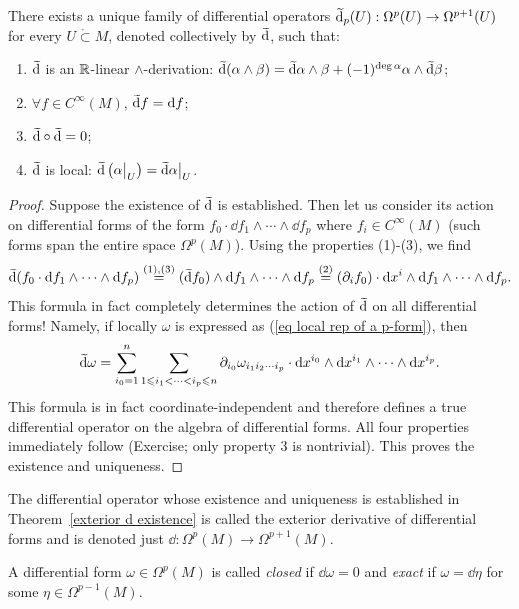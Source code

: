 \begin{thm}\label{exterior d existence}
    There exists a unique family of differential operators $\wt{\dd}_p(U):\Omega^p(U)\to \Omega^{p+1}(U)$ for every $U\mathring\subset M$, denoted collectively by $\wt\dd$, such that:
\begin{enumerate}
    \item $\wt\dd$ is an $\mathbb{R} $-linear $\wedge$-derivation: $\wt\dd(\alpha\wedge\beta)=\wt\dd\alpha\wedge\beta+(-1)^{\deg\alpha}\alpha\wedge\wt\dd\beta$;
    \item $\forall f\in C^\infty(M)$, $\wt\dd f=\dd f$;
    \item $\wt\dd\circ\wt\dd=0$;
    \item $\wt\dd$ is local: $\wt\dd\left(\restr{\alpha}{U}\right)=\restr{\wt\dd\alpha}{U}$.
\end{enumerate}
\end{thm}
\begin{proof}
Suppose the existence of $\wt\dd$ is established. Then let us consider its action on differential forms of the form $f_0\cdot \dd f_1\wedge \cdots \wedge \dd f_p$ where $f_i\in C^\infty(M)$ (such forms span the entire space $\Omega^p(M)$). Using the properties (1)-(3), we find
\[\wt\dd (f_0\cdot \dd f_1\wedge \cdots \wedge \dd f_p)\overset{(1),(3)}{=}(\wt\dd f_0) \wedge \dd f_1\wedge \cdots \wedge \dd f_p\overset{(2)}{=}(\partial_i f_0)\cdot \dd x^i\wedge \dd f_1\wedge \cdots \wedge \dd f_p.\]
This formula in fact completely determines the action of $\wt\dd$ on all differential forms! Namely, if locally $\omega$ is expressed as (\ref{eq local rep of a p-form}), then
\[\wt\dd \omega =\sum_{i_0=1}^n\sum_{1\leq i_1<\cdots <i_p\leq n}\partial_{i_0}\omega_{i_1 i_2\cdots i_p}\cdot \dd x^{i_0}\wedge \dd x^{i_1}\wedge\cdots\wedge \dd x^{i_p}.\label{eq local formula for d}\]
This formula is in fact coordinate-independent and therefore defines a true differential operator on the algebra of differential forms. All four properties immediately follow (Exercise; only property 3 is nontrivial). This proves the existence and uniqueness.
\end{proof}

\begin{defn}
    The differential operator whose existence and uniqueness is established in Theorem~\ref{exterior d existence} is called the exterior derivative of differential forms and is denoted just $\dd:\Omega^p(M)\to\Omega^{p+1}(M)$.

    A differential form $\omega\in\Omega^p(M)$ is called \emph{closed} if $\dd\omega=0$ and \emph{exact} if $\omega=\dd\eta$ for some $\eta\in\Omega^{p-1}(M)$. 
\end{defn}

